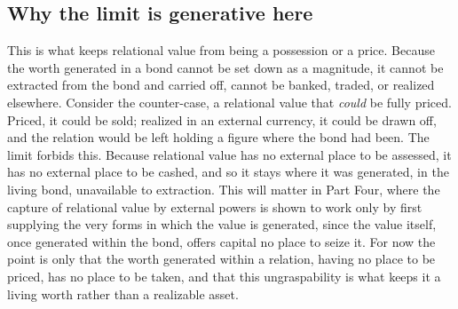 \subsection*{Why the limit is generative here}

This is what keeps relational value from being a possession or a price. Because the worth generated in a bond cannot be set down as a magnitude, it cannot be extracted from the bond and carried off, cannot be banked, traded, or realized elsewhere. Consider the counter-case, a relational value that \emph{could} be fully priced. Priced, it could be sold; realized in an external currency, it could be drawn off, and the relation would be left holding a figure where the bond had been. The limit forbids this. Because relational value has no external place to be assessed, it has no external place to be cashed, and so it stays where it was generated, in the living bond, unavailable to extraction. This will matter in Part Four, where the capture of relational value by external powers is shown to work only by first supplying the very forms in which the value is generated, since the value itself, once generated within the bond, offers capital no place to seize it. For now the point is only that the worth generated within a relation, having no place to be priced, has no place to be taken, and that this ungraspability is what keeps it a living worth rather than a realizable asset.
